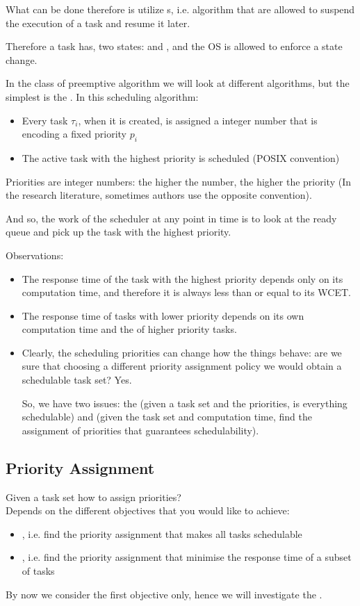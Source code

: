 What can be done therefore is utilize s, i.e. algorithm that are allowed to suspend the execution of a task and resume it later.

Therefore a task has, two states:  and , and the OS is allowed to enforce a state change.

In the class of preemptive algorithm we will look at different algorithms, but the simplest is the . In this scheduling algorithm:
\begin{itemize}
\item Every task $\tau_i$, when it is created, is assigned a integer number that is encoding a fixed priority $p_i$
\item The active task with the highest priority is scheduled (POSIX convention)
\end{itemize}
Priorities are integer numbers: the higher the number, the higher the priority (In the research literature, sometimes authors use the opposite convention).

And so, the work of the scheduler at any point in time is to look at the ready queue and pick up the task with the highest priority.

Observations:
\begin{itemize}
\item The response time of the task with the highest priority depends only on its computation time, and therefore it is always less than or equal to its WCET.
\item The response time of tasks with lower priority depends on its own computation time and the  of higher priority tasks.
\item Clearly, the scheduling priorities can change how the things behave: are we sure that choosing a different priority assignment policy we would obtain a schedulable task set? Yes.

So, we have two issues: the  (given a task set and the priorities, is everything schedulable) and  (given the task set and computation time, find the assignment of priorities that guarantees schedulability).
\end{itemize}

\subsection{Priority Assignment}
Given a task set how to assign priorities?\\
Depends on the different objectives that you would like to achieve:
\begin{itemize}
\item {}, i.e. find the priority assignment that makes all tasks schedulable
\item {}, i.e. find the priority assignment that minimise the response time of a subset of tasks
\end{itemize}
By now we consider the first objective only, hence we will investigate the .

